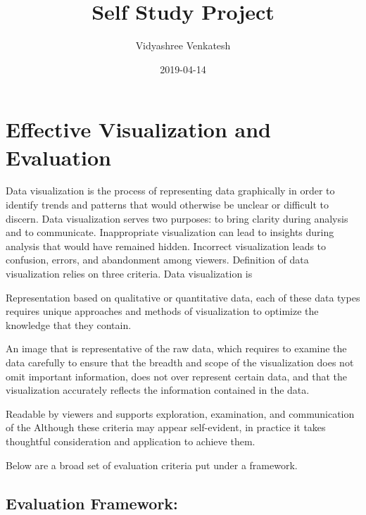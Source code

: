 \documentclass[]{book}
\title{Self Study Project}
\author{Vidyashree Venkatesh}
\date{2019-04-14}
\begin{document}
\maketitle

{
\setcounter{tocdepth}{1}
\tableofcontents
}
\hypertarget{effective-visualization-and-evaluation}{%
\chapter{Effective Visualization and Evaluation}\label{effective-visualization-and-evaluation}}

Data visualization is the process of representing data graphically in order to identify trends and patterns that would otherwise be unclear or difficult to discern. Data visualization serves two purposes: to bring clarity during analysis and to communicate. Inappropriate visualization can lead to insights during analysis that would have remained hidden. Incorrect visualization leads to confusion, errors, and abandonment among viewers.
Definition of data visualization relies on three criteria. Data visualization is

Representation based on qualitative or quantitative data, each of these data types requires unique approaches and methods of visualization to optimize the knowledge that they contain.

An image that is representative of the raw data, which requires to examine the data carefully to ensure that the breadth and scope of the visualization does not omit important information, does not over represent certain data, and that the visualization accurately reflects the information contained in the data.

Readable by viewers and supports exploration, examination, and communication of the
Although these criteria may appear self-evident, in practice it takes thoughtful consideration and application to achieve them.
\citep{visualization_eval}

Below are a broad set of evaluation criteria put under a framework.

\hypertarget{evaluation-framework}{%
\section{Evaluation Framework:}\label{evaluation-framework}}

\citep{Eval_Viz}
\end{document}
